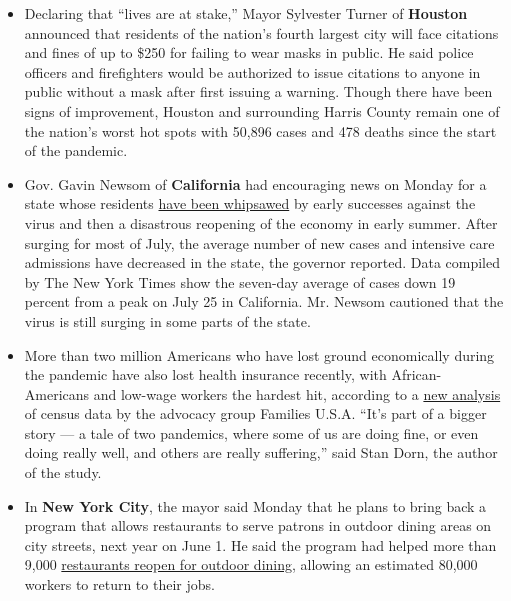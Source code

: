 \begin{itemize}
\item
  Declaring that ``lives are at stake,'' Mayor Sylvester Turner of
  \textbf{Houston} announced that residents of the nation's fourth
  largest city will face citations and fines of up to \$250 for failing
  to wear masks in public. He said police officers and firefighters
  would be authorized to issue citations to anyone in public without a
  mask after first issuing a warning. Though there have been signs of
  improvement, Houston and surrounding Harris County remain one of the
  nation's worst hot spots with 50,896 cases and 478 deaths since the
  start of the pandemic.
\item
  Gov. Gavin Newsom of \textbf{California} had encouraging news on
  Monday for a state whose residents
  \href{https://slack-redir.net/link?url=https\%3A\%2F\%2Fwww.nytimes3xbfgragh.onion\%2F2020\%2F07\%2F23\%2Fus\%2Fcalifornia-covid-19-cases.html}{have
  been whipsawed} by early successes against the virus and then a
  disastrous reopening of the economy in early summer. After surging for
  most of July, the average number of new cases and intensive care
  admissions have decreased in the state, the governor reported. Data
  compiled by The New York Times show the seven-day average of cases
  down 19 percent from a peak on July 25 in California. Mr. Newsom
  cautioned that the virus is still surging in some parts of the state.
\end{itemize}

\begin{itemize}
\item
  More than two million Americans who have lost ground economically
  during the pandemic have also lost health insurance recently, with
  African-Americans and low-wage workers the hardest hit, according to a
  \href{https://familiesusa.org/resources/americas-coverage-crisis-deepens-new-survey-data-show-millions-of-adults-became-uninsured-starting-in-late-june/}{new
  analysis} of census data by the advocacy group Families U.S.A. ``It's
  part of a bigger story --- a tale of two pandemics, where some of us
  are doing fine, or even doing really well, and others are really
  suffering,'' said Stan Dorn, the author of the study.
\item
  In \textbf{New York City}, the mayor said Monday that he plans to
  bring back a program that allows restaurants to serve patrons in
  outdoor dining areas on city streets, next year on June 1. He said the
  program had helped more than 9,000
  \href{https://www.nytimes3xbfgragh.onion/2020/08/03/nyregion/nyc-small-businesses-closing-coronavirus.html}{restaurants
  reopen for outdoor dining}, allowing an estimated 80,000 workers to
  return to their jobs.
\end{itemize}

